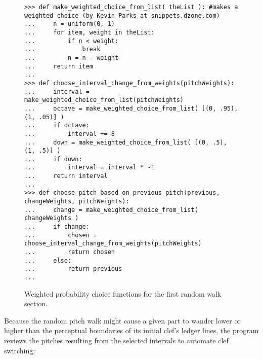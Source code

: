 \begin{figure}[H]
\begin{lstlisting}[basicstyle=\scriptsize\ttfamily, breaklines=True, tabsize=4, showtabs=false, showspaces=false]
>>> def make_weighted_choice_from_list( theList ): #makes a weighted choice (by Kevin Parks at snippets.dzone.com)
...     n = uniform(0, 1)
...     for item, weight in theList:
...         if n < weight:
...             break
...         n = n - weight
...     return item
... 
>>> def choose_interval_change_from_weights(pitchWeights):
...     interval = make_weighted_choice_from_list(pitchWeights)
...     octave = make_weighted_choice_from_list( [(0, .95), (1, .05)] )
...     if octave:
...         interval += 8
...     down = make_weighted_choice_from_list( [(0, .5), (1, .5)] )
...     if down:
...         interval = interval * -1
...     return interval
... 
>>> def choose_pitch_based_on_previous_pitch(previous, changeWeights, pitchWeights):
...     change = make_weighted_choice_from_list( changeWeights )
...     if change:
...         chosen = choose_interval_change_from_weights(pitchWeights)
...         return chosen
...     else:
...         return previous
... \end{lstlisting}

\caption{Weighted probability choice functions for the first random walk section. } 
\end{figure}

Because the random pitch walk might cause a given part to wander lower or higher than the perceptual boundaries of its initial clef's ledger lines, the program reviews the pitches resulting from the selected intervals to automate clef switching:


